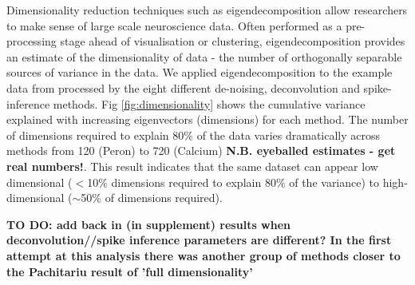 \documentclass[a4paper,10pt,twocolumn]{article}
\begin{document}

Dimensionality reduction techniques such as eigendecomposition allow researchers to make sense of large scale neuroscience data. Often performed as a pre-processing stage ahead of visualisation or clustering, eigendecomposition provides an estimate of the dimensionality of data - the number of orthogonally separable sources of variance in the data. We applied eigendecomposition to the example data from \citealt{Peron2015-kd} processed by the eight different de-noising, deconvolution and spike-inference methods. Fig \ref{fig:dimensionality} shows the cumulative variance explained with increasing eigenvectors (dimensions) for each method. The number of dimensions required to explain 80$\%$ of the data varies dramatically across methods from 120 (Peron) to 720 (Calcium) \textbf{N.B. eyeballed estimates - get real numbers!}. This result indicates that the same dataset can appear low dimensional ($<$10$\%$ dimensions required to explain 80$\%$ of the variance) to high-dimensional ($\sim$50$\%$ of dimensions required).

\textbf{TO DO: add back in (in supplement) results when deconvolution//spike inference parameters are different? In the first attempt at this analysis there was another group of methods closer to the Pachitariu result of 'full dimensionality'}
\end{document}
